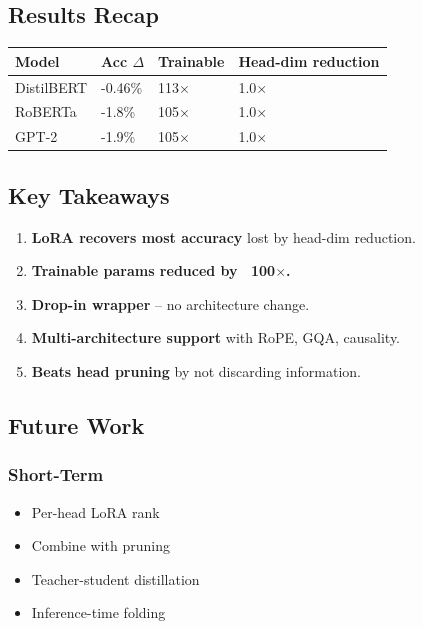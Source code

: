 \subsection{Results Recap}

\begin{table}[H]
\centering
\small
\begin{tabular}{llll}
\toprule
\textbf{Model} & \textbf{Acc $\Delta$} & \textbf{Trainable} & \textbf{Head-dim reduction} \\
\midrule
DistilBERT & -0.46\% & 113$\times$ & 1.0$\times$ \\
RoBERTa & -1.8\% & 105$\times$ & 1.0$\times$ \\
GPT-2 & -1.9\% & 105$\times$ & 1.0$\times$ \\
\bottomrule
\end{tabular}
\end{table}

\subsection{Key Takeaways}

\begin{enumerate}
\item \textbf{LoRA recovers most accuracy} lost by head-dim reduction.
\item \textbf{Trainable params reduced by ~100$\times$.}
\item \textbf{Drop-in wrapper} -- no architecture change.
\item \textbf{Multi-architecture support} with RoPE, GQA, causality.
\item \textbf{Beats head pruning} by not discarding information.

\end{enumerate}
\subsection{Future Work}

\subsubsection{Short-Term}
\begin{itemize}
\item Per-head LoRA rank
\item Combine with pruning
\item Teacher-student distillation
\item Inference-time folding

\end{itemize}
